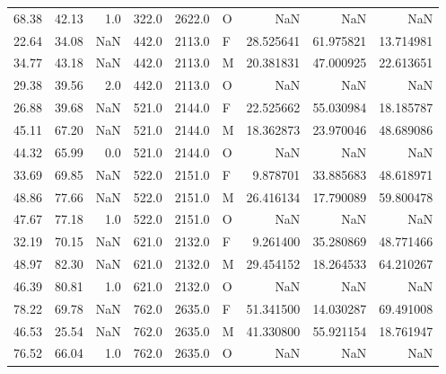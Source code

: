 \begin{table}
\begin{tabular}{rrrrrlrrr}
68.38 &  42.13 &      1.0 &  322.0 & 2622.0 &      O &       NaN &       NaN &       NaN \\
22.64 &  34.08 &      NaN &  442.0 & 2113.0 &      F & 28.525641 & 61.975821 & 13.714981 \\
34.77 &  43.18 &      NaN &  442.0 & 2113.0 &      M & 20.381831 & 47.000925 & 22.613651 \\
29.38 &  39.56 &      2.0 &  442.0 & 2113.0 &      O &       NaN &       NaN &       NaN \\
26.88 &  39.68 &      NaN &  521.0 & 2144.0 &      F & 22.525662 & 55.030984 & 18.185787 \\
45.11 &  67.20 &      NaN &  521.0 & 2144.0 &      M & 18.362873 & 23.970046 & 48.689086 \\
44.32 &  65.99 &      0.0 &  521.0 & 2144.0 &      O &       NaN &       NaN &       NaN \\
33.69 &  69.85 &      NaN &  522.0 & 2151.0 &      F &  9.878701 & 33.885683 & 48.618971 \\
48.86 &  77.66 &      NaN &  522.0 & 2151.0 &      M & 26.416134 & 17.790089 & 59.800478 \\
47.67 &  77.18 &      1.0 &  522.0 & 2151.0 &      O &       NaN &       NaN &       NaN \\
32.19 &  70.15 &      NaN &  621.0 & 2132.0 &      F &  9.261400 & 35.280869 & 48.771466 \\
48.97 &  82.30 &      NaN &  621.0 & 2132.0 &      M & 29.454152 & 18.264533 & 64.210267 \\
46.39 &  80.81 &      1.0 &  621.0 & 2132.0 &      O &       NaN &       NaN &       NaN \\
78.22 &  69.78 &      NaN &  762.0 & 2635.0 &      F & 51.341500 & 14.030287 & 69.491008 \\
46.53 &  25.54 &      NaN &  762.0 & 2635.0 &      M & 41.330800 & 55.921154 & 18.761947 \\
76.52 &  66.04 &      1.0 &  762.0 & 2635.0 &      O &       NaN &       NaN &       NaN \\
\bottomrule
\end{tabular}
\end{table}
